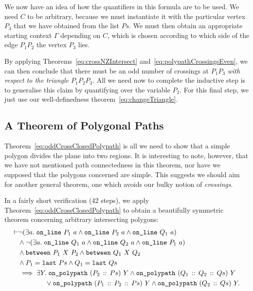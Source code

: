 We now have an idea of how the quantifiers in this formula are to be used. We need $C$ to be arbitrary, because we must instantiate it with the particular vertex $P_3$ that we have obtained from the list $Ps$. We must then obtain an appropriate starting context $\Gamma$ depending on $C$, which is chosen according to which side of the edge $P_1P_2$ the vertex $P_3$ lies. 

By applying Theorems~\ref{eq:crossNZIntersect} and~\ref{eq:polypathCrossingsEven}, we can then conclude that there must be an odd number of crossings at $P_1P_3$ \emph{with respect to the triangle $P_1P_2P_3$}. All we need now to complete the inductive step is to generalise this claim by quantifying over the variable $P_2$. For this final step, we just use our well-definedness theorem~\eqref{eq:changeTriangle}.

\subsection{A Theorem of Polygonal Paths}\label{sec:PathTheorem}
Theorem~\ref{eq:oddCrossClosedPolypath} is all we need to show that a simple polygon divides the plane into two regions. It is interesting to note, however, that we have not mentioned path connectedness in this theorem, nor have we supposed that the polygons concerned are simple. This suggests we should aim for another general theorem, one which avoids our bulky notion of \emph{crossings}. 

In a fairly short verification (42 steps), we apply Theorem~\ref{eq:oddCrossClosedPolypath} to obtain a beautifully symmetric theorem concerning arbitrary intersecting polygons:
\begin{equation}\label{eq:intersectPolypathClosed}
  \begin{aligned}
    \vdash&\neg(\exists a.\; \texttt{on\_line}\ P_1\ a\wedge \texttt{on\_line}\ P_2\ a\wedge \texttt{on\_line}\ Q_1\ a)\\
    &\wedge\neg(\exists a.\; \texttt{on\_line}\ Q_1\ a\wedge \texttt{on\_line}\ Q_2\ a\wedge \texttt{on\_line}\ P_1\ a)\\
    &\wedge\texttt{between}\ P_1\ X\ P_2 \wedge \texttt{between}\ Q_1\ X\ Q_2\\
    &\wedge P_1 = \texttt{last}\ Ps \wedge Q_1 = \texttt{last}\ Qs\\
    &\implies \exists Y.\; \texttt{on\_polypath}\ (P_2\,::\,Ps)\ Y \wedge \texttt{on\_polypath}\ (Q_1\,::\,Q_2\,::\,Qs)\ Y\\
    &\qquad\qquad\vee \texttt{on\_polypath}\ (P_1\,::\,P_2\,::\,Ps)\ Y \wedge \texttt{on\_polypath}\ (Q_2\,::\,Qs)\ Y.
  \end{aligned}
\end{equation}


